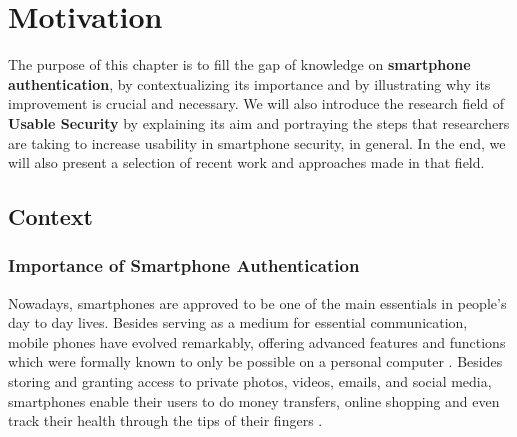 
\chapter{Motivation}\label{ch:second}

The purpose of this chapter is to fill the gap of knowledge on \textbf{smartphone authentication}, by contextualizing its importance and by illustrating why its improvement is crucial and necessary. We will also introduce the research field of \textbf{Usable Security} by explaining its aim and portraying the steps that researchers are taking to increase usability in smartphone security, in general. In the end, we will also present a selection of recent work and approaches made in that field.  

\section{Context}

\subsection{Importance of Smartphone Authentication} \label{2.1.1}

Nowadays, smartphones are approved to be one of the main essentials in people's day to day lives. Besides serving as a medium for essential communication, mobile phones have evolved remarkably, offering advanced features and functions which were formally known to only be possible on a personal computer \cite{Alsaleh}. Besides storing and granting access to private photos, videos, emails, and social media, smartphones enable their users to do money transfers, online shopping and even track their health through the tips of their fingers \cite{Egelman:2014:YRL:2660267.2660273,Albayram:2017:BUL:3235924.3235929,Schloeglhofer}. \\

